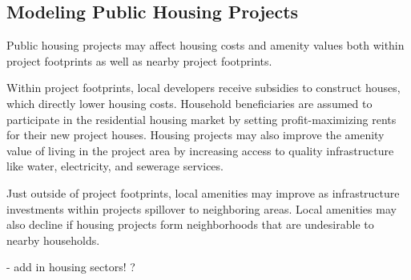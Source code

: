 \documentclass[12pt]{article}
\begin{document}
\subsection{Modeling Public Housing Projects}

Public housing projects may affect housing costs and amenity values both within project footprints as well as nearby project footprints.  

Within project footprints, local developers receive subsidies to construct houses, which directly lower housing costs.  Household beneficiaries are assumed to participate in the residential housing market by setting profit-maximizing rents for their new project houses.  Housing projects may also improve the amenity value of living in the project area by increasing access to quality infrastructure like water, electricity, and sewerage services.  

Just outside of project footprints, local amenities may improve as infrastructure investments within projects spillover to neighboring areas.  Local amenities may also decline if housing projects form neighborhoods that are undesirable to nearby households.



- add in housing sectors!  ?











\end{document}
